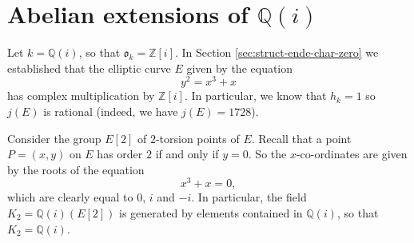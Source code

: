 \newpage
\section{Abelian extensions of $\mathbb{Q}(i)$}
\label{sec:abel-extens-Qi}

Let $k = \mathbb{Q}(i)$, so that $\mathfrak{o}_{k} = \mathbb{Z}[i]$.  In Section
\ref{sec:struct-ende-char-zero} we established that the elliptic curve $E$ given by
the equation
\begin{equation*}
  y^{2} = x^{3} + x
\end{equation*}
has complex multiplication by $\mathbb{Z}[i]$.  In particular, we know that $h_{k} =
1$ so $j(E)$ is rational (indeed, we have $j(E) = 1728$).

Consider the group $E[2]$ of $2$-torsion points of $E$.  Recall that a point $P =
(x,y)$ on $E$ has order $2$ if and only if $y = 0$.  So the $x$-co-ordinates are
given by the roots of the equation
\begin{equation*}
  x^{3} + x = 0,
\end{equation*}
which are clearly equal to $0$, $i$ and $-i$.  In particular, the field $K_{2} =
\mathbb{Q}(i)(E[2])$ is generated by elements contained in $\mathbb{Q}(i)$, so that
$K_{2} = \mathbb{Q}(i)$.


